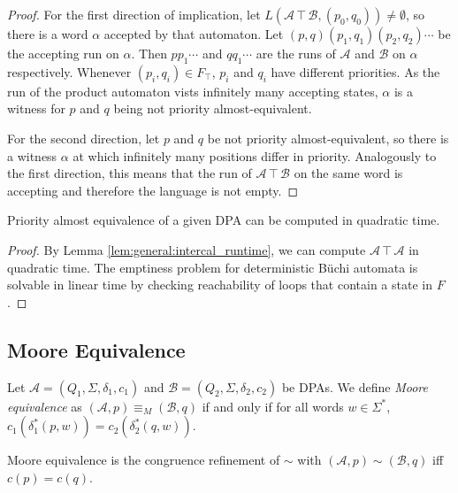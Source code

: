 \begin{proof}
	For the first direction of implication, let $L(\mathcal{A} \intercal \mathcal{B}, (p_0, q_0)) \neq \emptyset$, so there is a word $\alpha$ accepted by that automaton. Let $(p, q) (p_1, q_1) (p_2, q_2) \cdots$ be the accepting run on $\alpha$. Then $p p_1 \cdots$ and $q q_1 \cdots$ are the runs of $\mathcal{A}$ and $\mathcal{B}$ on $\alpha$ respectively. Whenever $(p_i, q_i) \in F_\intercal$, $p_i$ and $q_i$ have different priorities. As the run of the product automaton vists infinitely many accepting states, $\alpha$ is a witness for $p$ and $q$ being not priority almost-equivalent.
	
	For the second direction, let $p$ and $q$ be not priority almost-equivalent, so there is a witness $\alpha$ at which infinitely many positions differ in priority. Analogously to the first direction, this means that the run of $\mathcal{A} \intercal \mathcal{B}$ on the same word is accepting and therefore the language is not empty.
\end{proof}

\begin{cor}
	Priority almost equivalence of a given DPA can be computed in quadratic time.
\end{cor}

\begin{proof}
	By Lemma \ref{lem:general:intercal_runtime}, we can compute $\mathcal{A} \intercal \mathcal{A}$ in quadratic time. The emptiness problem for deterministic B\"uchi automata is solvable in linear time by checking reachability of loops that contain a state in $F$. 
\end{proof}

\vspace{5pt}

\subsection{Moore Equivalence}

\begin{defn}
	Let $\mathcal{A} = (Q_1, \Sigma, \delta_1, c_1)$ and $\mathcal{B} = (Q_2, \Sigma, \delta_2, c_2)$ be DPAs. We define \emph{Moore equivalence} as $(\mathcal{A}, p) \equiv_M (\mathcal{B}, q)$ if and only if for all words $w \in \Sigma^*$, $c_1(\delta_1^*(p, w)) = c_2(\delta_2^*(q, w))$.
\end{defn}

\begin{lem}
	Moore equivalence is the congruence refinement of $\sim$ with $(\mathcal{A}, p) \sim (\mathcal{B}, q)$ iff $c(p) = c(q)$.
\end{lem}

